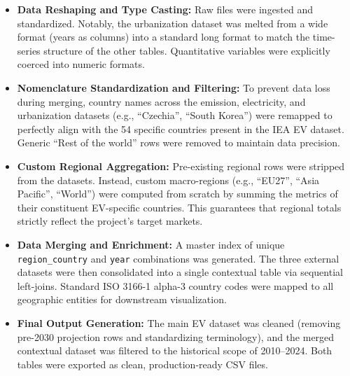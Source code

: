 \begin{itemize}
    \item \textbf{Data Reshaping and Type Casting:} Raw files were ingested and standardized. Notably, the urbanization dataset was melted from a wide format (years as columns) into a standard long format to match the time-series structure of the other tables. Quantitative variables were explicitly coerced into numeric formats.
    \item \textbf{Nomenclature Standardization and Filtering:} To prevent data loss during merging, country names across the emission, electricity, and urbanization datasets (e.g., ``Czechia'', ``South Korea'') were remapped to perfectly align with the 54 specific countries present in the IEA EV dataset. Generic ``Rest of the world'' rows were removed to maintain data precision.
    \item \textbf{Custom Regional Aggregation:} Pre-existing regional rows were stripped from the datasets. Instead, custom macro-regions (e.g., ``EU27'', ``Asia Pacific'', ``World'') were computed from scratch by summing the metrics of their constituent EV-specific countries. This guarantees that regional totals strictly reflect the project's target markets.
    \item \textbf{Data Merging and Enrichment:} A master index of unique \texttt{region\_country} and \texttt{year} combinations was generated. The three external datasets were then consolidated into a single contextual table via sequential left-joins. Standard ISO 3166-1 alpha-3 country codes were mapped to all geographic entities for downstream visualization.
    \item \textbf{Final Output Generation:} The main EV dataset was cleaned (removing pre-2030 projection rows and standardizing terminology), and the merged contextual dataset was filtered to the historical scope of 2010--2024. Both tables were exported as clean, production-ready CSV files.
\end{itemize}